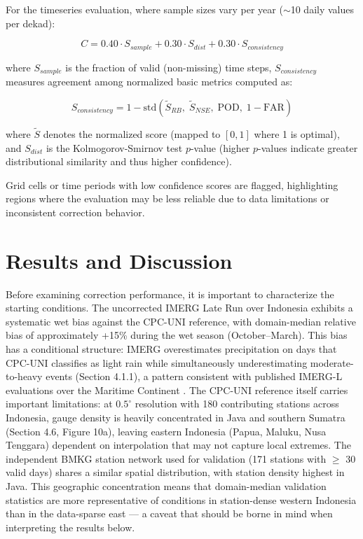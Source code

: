 \documentclass[remotesensing,article,submit,pdftex,moreauthors]{Definitions/mdpi}
\begin{document}
For the timeseries evaluation, where sample sizes vary per year
($\sim$10 daily values per dekad):

\[C = 0.40 \cdot S_{sample} + 0.30 \cdot S_{dist} + 0.30 \cdot S_{consistency}\]

where \(S_{sample}\) is the fraction of valid (non-missing) time steps,
\(S_{consistency}\) measures agreement among normalized basic metrics
computed as:

\[S_{consistency} = 1 - \text{std}\left(\tilde{S}_{RB}, \; \tilde{S}_{NSE}, \; \text{POD}, \; 1 - \text{FAR}\right)\]

where \(\tilde{S}\) denotes the normalized score (mapped to \([0, 1]\)
where 1 is optimal), and \(S_{dist}\) is the Kolmogorov-Smirnov test
\(p\)-value (higher \(p\)-values indicate greater distributional
similarity and thus higher confidence).

Grid cells or time periods with low confidence scores are flagged,
highlighting regions where the evaluation may be less reliable due to
data limitations or inconsistent correction behavior.

\section{Results and Discussion}\label{results-and-discussion}

Before examining correction performance, it is important to characterize
the starting conditions. The uncorrected IMERG Late Run over Indonesia
exhibits a systematic wet bias against the CPC-UNI reference, with
domain-median relative bias of approximately +15\% during the wet season
(October--March). This bias has a conditional structure: IMERG
overestimates precipitation on days that CPC-UNI classifies as light
rain while simultaneously underestimating moderate-to-heavy events
(Section 4.1.1), a pattern consistent with published IMERG-L evaluations
over the Maritime Continent \cite{ref31,ref32,ref33}. The CPC-UNI reference itself
carries important limitations: at \(0.5^{\circ}\) resolution with 180
contributing stations across Indonesia, gauge density is heavily
concentrated in Java and southern Sumatra (Section 4.6, Figure 10a),
leaving eastern Indonesia (Papua, Maluku, Nusa Tenggara) dependent on
interpolation that may not capture local extremes. The independent BMKG
station network used for validation (171 stations with \(\geq\) 30 valid
days) shares a similar spatial distribution, with station density
highest in Java. This geographic concentration means that domain-median
validation statistics are more representative of conditions in
station-dense western Indonesia than in the data-sparse east --- a
caveat that should be borne in mind when interpreting the results below.
\end{document}
